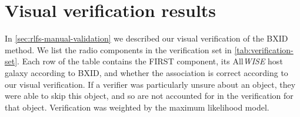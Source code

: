 \section{Visual verification results}
\label{sec:rlfs-verification-appendix}
  
  In \autoref{sec:rlfs-manual-validation} we described our visual verification of the BXID method. We list the radio components in the verification set in \autoref{tab:verification-set}. Each row of the table contains the FIRST component, its All\emph{WISE} host galaxy according to BXID, and whether the association is correct according to our visual verification. If a verifier was particularly unsure about an object, they were able to skip this object, and so are not accounted for in the verification for that object. Verification was weighted by the \citet{dawid79em} maximum likelihood model.

